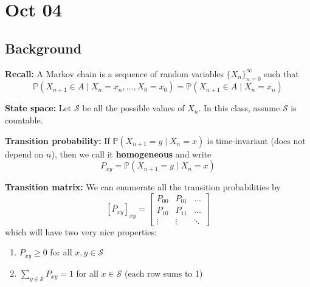 \documentclass[12pt]{report}
\renewcommand{\P}{\mathbb{P}}
\renewcommand{\S}{\mathcal{S}}
\begin{document}
    \begin{center}
    \end{center}

\section{Oct 04}
\subsection*{Background}
    \textbf{Recall:} A Markov chain is a sequence of random variables $\{X_n\}_{n=0}^{\infty}$ such that
    \[\P(X_{n+1} \in A\; | \; X_{n} = x_n, \dots, X_0 = x_0) = \P(X_{n+1} \in A \; | \; X_n = x_n)\] 

    \textbf{State space:} Let $\S$ be all the possible values of $X_n$. In this class, assume $\S$ is countable.
    
    \textbf{Transition probability:} If $\P(X_{n+1} = y \; | \; X_n = x)$ is time-invariant (does not depend on $n$), then we call it \textbf{homogeneous} and write 
    \[P_{xy} = \P(X_{n+1} = y \; | \; X_n = x)\]

    \textbf{Transition matrix:} We can enumerate all the transition probabilities by 
    \[[P_{xy}]_{xy} = \begin{bmatrix}
        P_{00} & P_{01} & \dots\\
        P_{10} & P_{11} & \dots\\
        \vdots & \vdots & \ddots
    \end{bmatrix}\]
    which will have two very nice properties:
    \begin{enumerate}
        \item $P_{xy} \geq 0$ for all $x, y \in \S$
        \item $\sum_{y \in \S} P_{xy} = 1$ for all $x \in \S$ (each row sums to 1)
    \end{enumerate}
\end{document}
